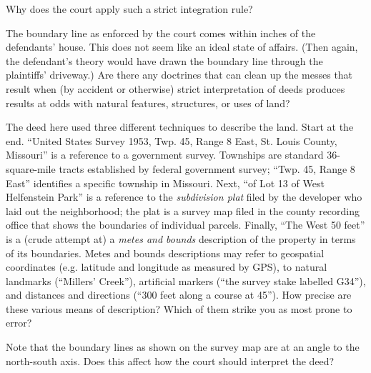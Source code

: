 
\item Why does the court apply such a strict integration rule?

\item The boundary line as enforced by the court comes within inches of the
defendants' house. This does not seem like an ideal state of affairs. (Then
again, the defendant's theory would have drawn the boundary line through the
plaintiffs' driveway.) Are there any doctrines that can clean up the messes
that result when (by accident or otherwise) strict interpretation of deeds
produces results at odds with natural features, structures, or uses of land?


\item The deed here used three different techniques to describe the land. Start
at the end. ``United States Survey 1953, Twp. 45, Range 8 East, St. Louis
County, Missouri'' is a reference to a government survey. Townships are
standard 36-square-mile tracts established by federal government survey; ``Twp.
45, Range 8 East'' identifies a specific township in Missouri. Next, ``of Lot
13 of West Helfenstein Park'' is a reference to the \textit{subdivision plat}
filed by the developer who laid out the neighborhood; the plat is a survey map
filed in the county recording office that shows the boundaries of individual
parcels. Finally, ``The West 50 feet'' is a (crude attempt at) a \textit{metes
and bounds} description of the property in terms of its boundaries. Metes and
bounds descriptions may refer to geospatial coordinates (e.g. latitude and
longitude as measured by GPS), to natural landmarks (``Millers' Creek''),
artificial markers (``the survey stake labelled G34''), and distances and
directions (``300 feet along a course at 45\textdegree''). How precise are these
various means of description? Which of them strike you as most prone to error?


\item Note that the boundary lines as shown on the survey map are at an angle to
the north-south axis. Does this affect how the court should interpret the deed?

